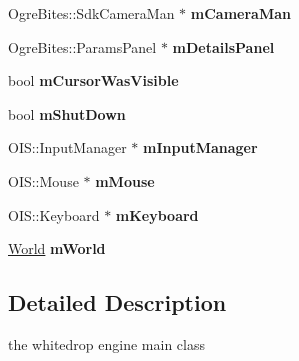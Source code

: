 \begin{DoxyCompactItemize}
\item 
\hypertarget{class_whitedrop_1_1_whitedrop_engine_acf78fb146a1046e150abc874834287ac}{Ogre\+Bites\+::\+Sdk\+Camera\+Man $\ast$ {\bfseries m\+Camera\+Man}}\label{class_whitedrop_1_1_whitedrop_engine_acf78fb146a1046e150abc874834287ac}

\item 
\hypertarget{class_whitedrop_1_1_whitedrop_engine_a57f32e46ffb705d29cc1cc64cf20afd1}{Ogre\+Bites\+::\+Params\+Panel $\ast$ {\bfseries m\+Details\+Panel}}\label{class_whitedrop_1_1_whitedrop_engine_a57f32e46ffb705d29cc1cc64cf20afd1}

\item 
\hypertarget{class_whitedrop_1_1_whitedrop_engine_a89add6423c6193c5d43ee274fdfdf9c0}{bool {\bfseries m\+Cursor\+Was\+Visible}}\label{class_whitedrop_1_1_whitedrop_engine_a89add6423c6193c5d43ee274fdfdf9c0}

\item 
\hypertarget{class_whitedrop_1_1_whitedrop_engine_aba3f57967bc77fe8228dae5818519129}{bool {\bfseries m\+Shut\+Down}}\label{class_whitedrop_1_1_whitedrop_engine_aba3f57967bc77fe8228dae5818519129}

\item 
\hypertarget{class_whitedrop_1_1_whitedrop_engine_a6beb2aee63933af8e7e21a300e243921}{O\+I\+S\+::\+Input\+Manager $\ast$ {\bfseries m\+Input\+Manager}}\label{class_whitedrop_1_1_whitedrop_engine_a6beb2aee63933af8e7e21a300e243921}

\item 
\hypertarget{class_whitedrop_1_1_whitedrop_engine_a88c755aba2d153c41db17252d3dafddb}{O\+I\+S\+::\+Mouse $\ast$ {\bfseries m\+Mouse}}\label{class_whitedrop_1_1_whitedrop_engine_a88c755aba2d153c41db17252d3dafddb}

\item 
\hypertarget{class_whitedrop_1_1_whitedrop_engine_a18b8d7907da3d24e4daf85c17dc441eb}{O\+I\+S\+::\+Keyboard $\ast$ {\bfseries m\+Keyboard}}\label{class_whitedrop_1_1_whitedrop_engine_a18b8d7907da3d24e4daf85c17dc441eb}

\item 
\hypertarget{class_whitedrop_1_1_whitedrop_engine_a9857926296ff572b0dcd34bb4a4177c6}{\hyperlink{class_whitedrop_1_1_world}{World} {\bfseries m\+World}}\label{class_whitedrop_1_1_whitedrop_engine_a9857926296ff572b0dcd34bb4a4177c6}

\end{DoxyCompactItemize}


\subsection{Detailed Description}
the whitedrop engine main class 


